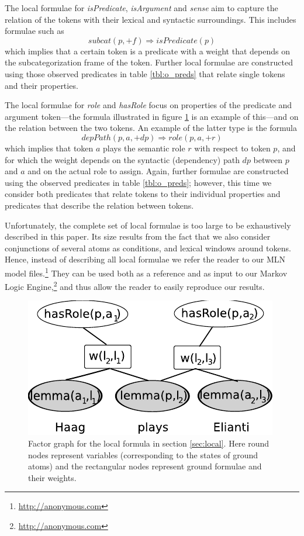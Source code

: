 The local formulae for \emph{isPredicate}, \emph{isArgument} and \emph{sense} aim to capture the relation of the tokens with their lexical and syntactic surroundings. This includes formulae such as 
\[subcat(p,+f) \Rightarrow isPredicate(p)\]
which implies that a certain token is a predicate with a weight that depends on the subcategorization frame of the token. Further local formulae are constructed using those observed predicates in table \ref{tbl:o_preds} that relate single tokens and their properties.

The local formulae for \emph{role} and \emph{hasRole} focus on properties of the predicate and argument token---the formula illustrated in figure \ref{fig:local2} is an example of this---and on the relation between the two tokens. An example of the latter type is the formula
\[depPath(p,a,+dp) \Rightarrow role(p,a,+r)\]
which implies that token $a$ plays the semantic role $r$ with respect to token $p$, and for which the weight depends on the syntactic (dependency) path $dp$ between $p$ and $a$ and on the actual role to assign. Again, further formulae are constructed using the observed predicates in table \ref{tbl:o_preds}; however, this time we consider both predicates that relate tokens to their individual properties and predicates that describe the relation between tokens.

Unfortunately, the complete set of local formulae is too large to be exhaustively described in this paper. Its size results from the fact that we also consider conjunctions of several atoms as conditions, and lexical windows around tokens. Hence, instead of describing all local formulae we refer the reader
to our MLN model files.\footnote{\url{http://anonymous.com}} They can be used both as a reference and as input to our Markov Logic
Engine,\footnote{\url{http://anonymous.com}} and thus allow the reader to easily reproduce our results. 

\begin{figure}
\begin{center}
    \includegraphics[scale=.70]{LocalFormula2}
\end{center}
\caption{Factor graph for the local formula in section \ref{sec:local}. Here round nodes represent variables (corresponding to the states of ground atoms) and the rectangular nodes represent ground formulae and their weights.}
\label{fig:local2}
\end{figure}


